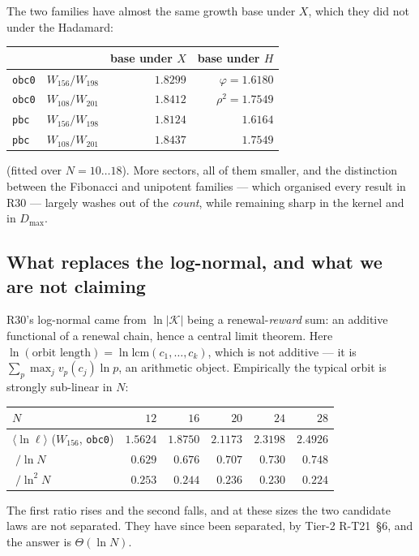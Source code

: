 \documentclass[11pt]{article}
\newcommand{\rt}[1]{\texttt{#1}}
\newcommand{\K}{\mathcal{K}}
\theoremstyle{plain}
\theoremstyle{remark}
\begin{document}
The two families have almost the same growth base under $X$, which they did not
under the Hadamard:
\begin{center}
\small
\begin{tabular}{llrr}
\toprule
& & base under $X$ & base under $H$ \\
\midrule
\rt{obc0} & $W_{156}/W_{198}$ & $1.8299$ & $\varphi=1.6180$ \\
\rt{obc0} & $W_{108}/W_{201}$ & $1.8412$ & $\rho^2=1.7549$ \\
\rt{pbc}  & $W_{156}/W_{198}$ & $1.8124$ & $1.6164$ \\
\rt{pbc}  & $W_{108}/W_{201}$ & $1.8437$ & $1.7549$ \\
\bottomrule
\end{tabular}
\end{center}
(fitted over $N=10\ldots18$). More sectors, all of them smaller, and the
distinction between the Fibonacci and unipotent families --- which organised
every result in R30 --- largely washes out of the \emph{count}, while remaining
sharp in the kernel and in $D_{\max}$.

\subsection{What replaces the log-normal, and what we are not claiming}

R30's log-normal came from $\ln|\K|$ being a renewal-\emph{reward} sum: an
additive functional of a renewal chain, hence a central limit theorem. Here
$\ln(\text{orbit length})=\ln\mathrm{lcm}(c_1,\ldots,c_k)$, which is not additive
--- it is $\sum_p \max_j v_p(c_j)\ln p$, an arithmetic object. Empirically the
typical orbit is strongly sub-linear in $N$:
\begin{center}
\small
\begin{tabular}{lrrrrr}
\toprule
$N$ & $12$ & $16$ & $20$ & $24$ & $28$ \\
\midrule
$\langle\ln \ell\rangle$ ($W_{156}$, \rt{obc0}) & $1.5624$ & $1.8750$ & $2.1173$ & $2.3198$ & $2.4926$ \\
$\;/\ln N$    & $0.629$ & $0.676$ & $0.707$ & $0.730$ & $0.748$ \\
$\;/\ln^2 N$  & $0.253$ & $0.244$ & $0.236$ & $0.230$ & $0.224$ \\
\bottomrule
\end{tabular}
\end{center}
The first ratio rises and the second falls, and at these sizes the two candidate
laws are not separated. They have since been separated, by Tier-2 R-T21~\S6, and the
answer is $\Theta(\ln N)$.
\end{document}

